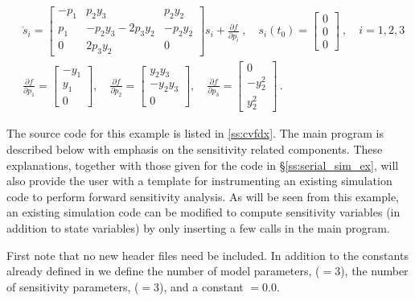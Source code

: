 \begin{equation}
  \begin{split}
    & {\dot s}_i = 
    \begin{bmatrix}
      - p_1 &   p_2 y_3             &   p_2 y_2 \\
        p_1 & - p_2 y_3 - 2 p_3 y_2 & - p_2 y_2 \\
        0   &             2 p_3 y_2 &  0              
    \end{bmatrix}
    s_i + \frac{\partial f}{\partial p_i} ~,
    \quad s_i(t_0) = \begin{bmatrix} 0 \\ 0 \\ 0 \end{bmatrix}  ~,
    \quad i = 1,2,3 \\
    & \frac{\partial f}{\partial p_1} = \begin{bmatrix} -y_1 \\ y_1 \\ 0 \end{bmatrix}, \quad
    \frac{\partial f}{\partial p_2} = \begin{bmatrix} y_2 y_3 \\ -y_2 y_3 \\ 0 \end{bmatrix}, \quad
    \frac{\partial f}{\partial p_3} = \begin{bmatrix} 0 \\ - y_2^2 \\ y_2^2 \end{bmatrix} \, .
  \end{split}
\end{equation}

The source code for this example is listed in \A\ref{ss:cvfdx}. The main program is described 
below with emphasis on the sensitivity related components. 
These explanations, together with those given for the code 
in \S\ref{ss:serial_sim_ex}, will also provide the user with a template for instrumenting 
an existing simulation code to perform forward sensitivity analysis.
As will be seen from this example, an existing simulation code can be modified to compute 
sensitivity variables (in addition to state variables) by only inserting a few {\cvodes} 
calls in the main program. 

First note that no new header files need be included. In addition to the constants already
defined in  we define the number of model parameters,  ($=3$),
the number of sensitivity parameters,  ($=3$), and a constant $=0.0$. 

